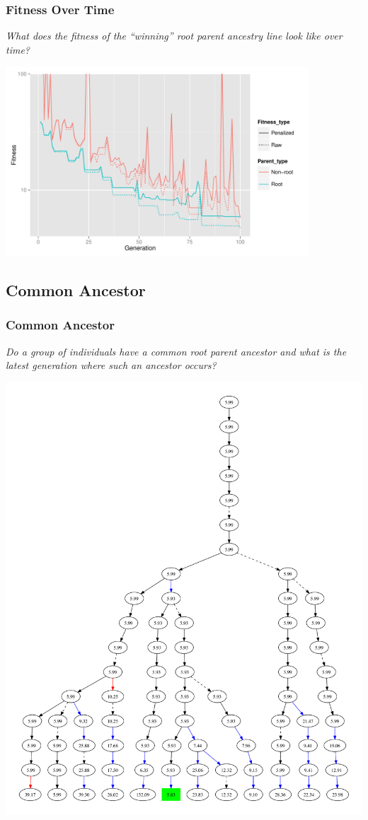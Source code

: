 \documentclass{beamer}
\begin{document}
\begin{frame}
\frametitle{Fitness Over Time}
\emph{What does the fitness of the ``winning'' root parent ancestry line look like over time?}
\begin{center}
\includegraphics[width=0.85\textwidth]{Combined_fitness_over_time}
\end{center}
\end{frame}

\subsection[Common Ancestor]{Common Ancestor}

\begin{frame}
\frametitle{Common Ancestor}
\emph{Do a group of individuals have a common root parent ancestor and what is the latest generation where such an ancestor occurs?}
\begin{center}
\includegraphics[height=0.75\textheight]{subset_confluence_trimmed}
\end{center}

\end{frame}
\end{document}

